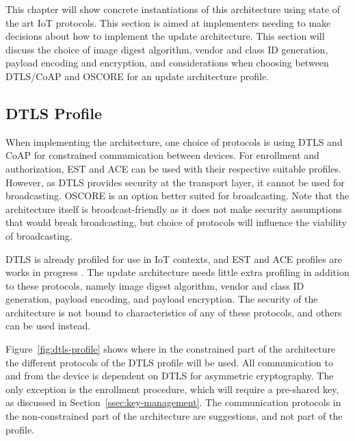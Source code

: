 \documentclass[0-thesis.tex]{subfiles}
\begin{document}
\label{chap:profiles}
This chapter will show concrete instantiations of this architecture using state of the art
IoT protocols. This section is aimed at implementers needing to make decisions about how
to implement the update architecture. This section will discuss the choice of image digest
algorithm, vendor and class ID generation, payload encoding and encryption, and
considerations when choosing between DTLS/CoAP and OSCORE for an update architecture
profile.

\subsection{DTLS Profile}
\label{ssec:dtls-profile}
When implementing the architecture, one choice of protocols is using DTLS and CoAP for
constrained communication between devices. For enrollment and authorization, EST and ACE
can be used with their respective suitable profiles. However, as DTLS provides security at
the transport layer, it cannot be used for broadcasting. OSCORE is an option better suited
for broadcasting. Note that the architecture itself is broadcast-friendly as it does not
make security assumptions that would break broadcasting, but choice of protocols will
influence the viability of broadcasting.

DTLS is already profiled for use in IoT contexts, and EST and ACE profiles are works in
progress \parencite{rfc7925, est-coaps, ace-dtls-profile}. The update architecture needs
little extra profiling in addition to these protocols, namely image digest algorithm,
vendor and class ID generation, payload encoding, and payload encryption. The security of
the architecture is not bound to characteristics of any of these protocols, and others can
be used instead.

Figure~\ref{fig:dtls-profile} shows where in the constrained part of the architecture the
different protocols of the DTLS profile will be used. All communication to and from the
device is dependent on DTLS for asymmetric cryptography. The only exception is the
enrollment procedure, which will require a pre-shared key, as discussed in
Section~\ref{ssec:key-management}. The communication protocols in the non-constrained part
of the architecture are suggestions, and not part of the profile.
\end{document}
